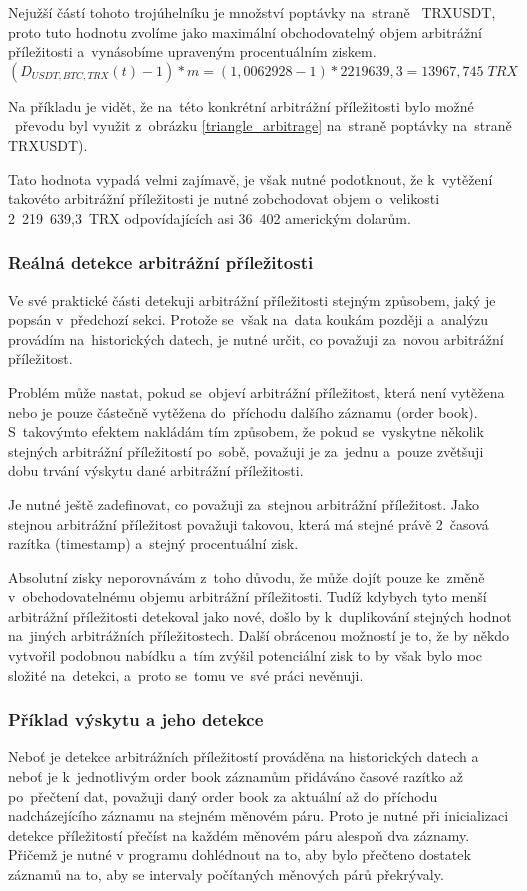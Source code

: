 \documentclass[thesis=B,czech]{FITthesis}[2019/03/21]
\begin{document}
Nejužší částí tohoto trojúhelníku je množství poptávky na~straně \linebreak~TRXUSDT, proto tuto hodnotu zvolíme jako maximální obchodovatelný objem arbitrážní příležitosti a~vynásobíme upraveným procentuálním ziskem. 
\[(D_{USDT,BTC,TRX}(t) - 1) * m = (1,0062928 - 1) * 2219639,3 = 13967,745\;TRX\]

Na příkladu je vidět, že na~této konkrétní arbitrážní příležitosti bylo možné ~převodu byl využit z~obrázku \ref{triangle_arbitrage} na~straně poptávky na~straně TRXUSDT).

Tato hodnota vypadá velmi zajímavě, je však nutné podotknout, že \linebreak k~vytěžení takovéto arbitrážní příležitosti je nutné zobchodovat objem o~velikosti 2~219~639,3~TRX odpovídajících asi 36~402 americkým dolarům. 

\subsubsection{Reálná detekce arbitrážní příležitosti}
Ve své praktické části detekuji arbitrážní příležitosti stejným způsobem, jaký je popsán v~předchozí sekci. Protože se~však na~data koukám později a~analýzu provádím na~historických datech, je nutné určit, co považuji za~novou arbitrážní příležitost.

Problém může nastat, pokud se~objeví arbitrážní příležitost, která není vytěžena nebo je pouze částečně vytěžena do~příchodu dalšího záznamu (order book). S~takovýmto efektem nakládám tím způsobem, že pokud se~vyskytne několik stejných arbitrážní příležitostí po~sobě, považuji je za~jednu a~pouze zvětšuji dobu trvání výskytu dané arbitrážní příležitosti.

Je nutné ještě zadefinovat, co považuji za~stejnou arbitrážní příležitost. Jako stejnou arbitrážní příležitost považuji takovou, která má stejné právě 2~časová razítka (timestamp) a~stejný procentuální zisk. 

Absolutní zisky neporovnávám z~toho důvodu, že může dojít pouze ke~změně v~obchodovatelnému objemu arbitrážní příležitosti. Tudíž kdybych tyto menší arbitrážní příležitosti detekoval jako nové, došlo by k~duplikování stejných hodnot na~jiných arbitrážních příležitostech. Další obrácenou možností je to, že by někdo vytvořil podobnou nabídku a~tím zvýšil potenciální zisk to by však bylo moc složité na~detekci, a~proto se~tomu ve~své práci nevěnuji. 

\subsubsection{Příklad výskytu a jeho detekce}
Neboť je detekce arbitrážních příležitostí prováděna na historických datech a neboť je k~jednotlivým order book záznamům přidáváno časové razítko až po~přečtení dat, považuji daný order book za aktuální až do příchodu nadcházejícího záznamu na stejném měnovém páru. Proto je nutné při inicializaci detekce příležitostí přečíst na každém měnovém páru alespoň dva záznamy. Přičemž je nutné v programu dohlédnout na to, aby bylo přečteno dostatek záznamů na to, aby se intervaly počítaných měnových párů překrývaly. 
\end{document}
